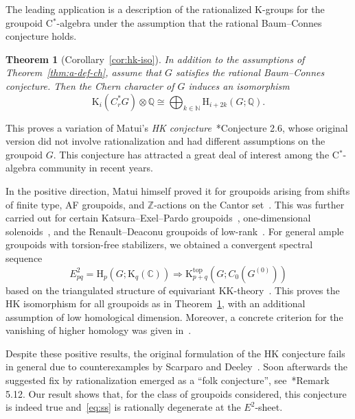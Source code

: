 \documentclass[a4paper,reqno]{amsart}
\theoremstyle{plain}
\newtheorem{theoremA}{Theorem}
\theoremstyle{definition}
\theoremstyle{remark}
\numberwithin{equation}{section}
\newcommand{\rH}{\mathrm{H}}
\newcommand{\rK}{\mathrm{K}}
\newcommand{\dC}{\mathbb{C}}
\newcommand{\dN}{\mathbb{N}}
\newcommand{\dQ}{\mathbb{Q}}
\newcommand{\dZ}{\mathbb{Z}}
\newcommand{\KK}{\mathrm{KK}}
\begin{document}
The leading application is a description of the rationalized $\rK$-groups for the groupoid C$^*$-algebra under the assumption that the rational Baum--Connes conjecture holds.

\begin{theoremA}[Corollary~\ref{cor:hk-iso}]\label{thm:main-thm}
In addition to the assumptions of Theorem~\ref{thm:a-def-ch}, assume that $G$ satisfies the rational Baum--Connes conjecture.
Then the Chern character of $G$ induces an isomorphism
\begin{equation*}%
\rK_i(C^*_r G)\otimes \dQ \cong \bigoplus_{k\in \dN} \rH_{i+2k}(G; \dQ).
\end{equation*}
\end{theoremA}

This proves a variation of Matui's \emph{HK conjecture}~\cite{matui:hkpub}*{Conjecture 2.6}, whose original version did not involve rationalization and had different assumptions on the groupoid $G$.
This conjecture has attracted a great deal of interest among the C$^*$-algebra community in recent years.

In the positive direction, Matui himself proved it for groupoids arising from shifts of finite type, AF groupoids, and $\dZ$-actions on the Cantor set~\cite{matui:hk}.
This was further carried out for certain Katsura--Exel--Pardo groupoids~\cite{ort:kep}, one-dimensional solenoids~\cite{yi:sol}, and the Renault--Deaconu groupoids of low-rank~\cite{fkps:hk}.
For general ample groupoids with torsion-free stabilizers, we obtained a convergent spectral sequence
\begin{equation}\label{eq:ss}
E^2_{pq} = \rH_p(G; \rK_q(\dC))\Rightarrow \rK_{p + q}^{\mathrm{top}}(G; C_0(G^{(0)}))
\end{equation}
based on the triangulated structure of equivariant $\KK$-theory~\cite{py:part-one}.
This proves the HK isomorphism for all groupoids as in Theorem~\ref{thm:main-thm}, with an additional assumption of low homological dimension.
Moreover, a concrete criterion for the vanishing of higher homology was given in~\cite{bdgw:matui}.

Despite these positive results, the original formulation of the HK conjecture fails in general due to counterexamples by Scarparo and Deeley~\cites{scarparo:homod,deeley:counthk}.
Soon afterwards the suggested fix by rationalization emerged as a ``folk conjecture'', see~\cite{bdgw:matui}*{Remark 5.12}.
Our result shows that, for the class of groupoids considered, this conjecture is indeed true and~\eqref{eq:ss} is rationally degenerate at the $E^2$-sheet.
\end{document}
